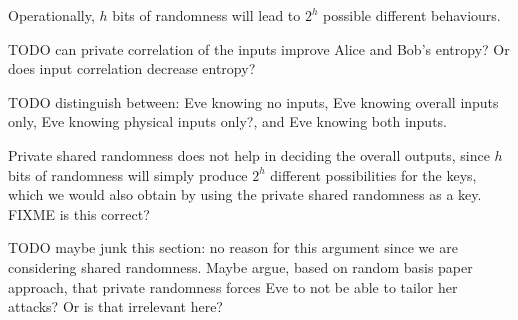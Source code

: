 \documentclass[10pt, a4paper]{article}
\numberwithin{equation}{section} %
\theoremstyle{definition}
\theoremstyle{plain}
\newcommand{\?}{\mathrel{?}} %
\begin{document}
      Operationally, \(h\) bits of randomness will lead to \(2^h\) possible different behaviours.

      TODO can private correlation of the inputs improve Alice and Bob's entropy? Or does input correlation decrease entropy?

      TODO distinguish between: Eve knowing no inputs, Eve knowing overall inputs only, Eve knowing physical inputs only?, and Eve knowing both inputs.

      Private shared randomness does not help in deciding the overall outputs, since \(h\) bits of randomness will simply produce \(2^h\) different possibilities for the keys, which we would also obtain by using the private shared randomness as a key. FIXME is this correct?

      TODO maybe junk this section: no reason for this argument since we are considering shared randomness. Maybe argue, based on random basis paper approach, that private randomness forces Eve to not be able to tailor her attacks? Or is that irrelevant here?
\end{document}
